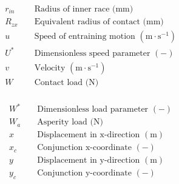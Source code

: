 \begin{align*}
	&r_{i n} && \text { Radius of inner race (mm) } \\
	&R_{z x} && \text { Equivalent radius of contact (mm) } \\
	&u && \text { Speed of entraining motion }\left(\mathrm{m} \cdot \mathrm{s}^{-1}\right) \\
	&U^* && \text { Dimensionless speed parameter }(-) \\
	&v && \text { Velocity }\left(\mathrm{m} \cdot \mathrm{s}^{-1}\right) \\
	&W && \text { Contact load (N) } \\
\end{align*}

\pagebreak

\begin{align*}
	&W^* && \text { Dimensionless load parameter }(-) \\
	&W_a && \text { Asperity load (N) } \\
	&x && \text { Displacement in x-direction }(\mathrm{m}) \\
	&x_c && \text { Conjunction x-coordinate }(-) \\
	&y && \text { Displacement in y-direction }(\mathrm{m}) \\
	&y_c && \text { Conjunction y-coordinate }(-) \\
\end{align*}
	
